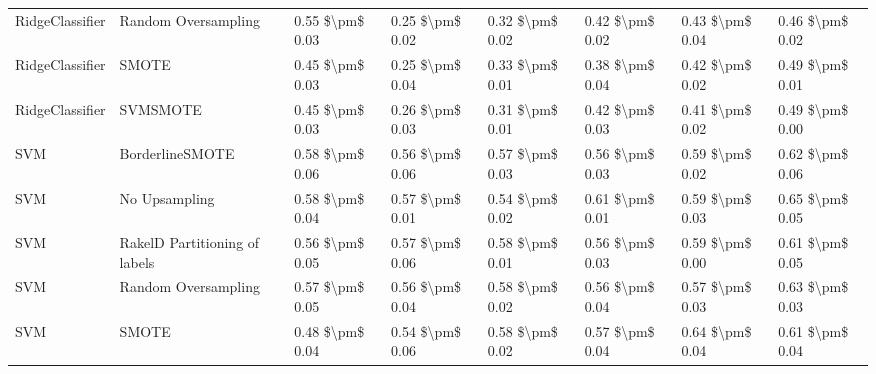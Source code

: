 \begin{tabular}{llllllll}
                RidgeClassifier &           Random Oversampling & 0.55 \$\textbackslash pm\$ 0.03 &           0.25 \$\textbackslash pm\$ 0.02 &       0.32 \$\textbackslash pm\$ 0.02 &        0.42 \$\textbackslash pm\$ 0.02 &                         0.43 \$\textbackslash pm\$ 0.04 & 0.46 \$\textbackslash pm\$ 0.02 \\
                RidgeClassifier &                         SMOTE & 0.45 \$\textbackslash pm\$ 0.03 &           0.25 \$\textbackslash pm\$ 0.04 &       0.33 \$\textbackslash pm\$ 0.01 &        0.38 \$\textbackslash pm\$ 0.04 &                         0.42 \$\textbackslash pm\$ 0.02 & 0.49 \$\textbackslash pm\$ 0.01 \\
                RidgeClassifier &                      SVMSMOTE & 0.45 \$\textbackslash pm\$ 0.03 &           0.26 \$\textbackslash pm\$ 0.03 &       0.31 \$\textbackslash pm\$ 0.01 &        0.42 \$\textbackslash pm\$ 0.03 &                         0.41 \$\textbackslash pm\$ 0.02 & 0.49 \$\textbackslash pm\$ 0.00 \\
                            SVM &               BorderlineSMOTE & 0.58 \$\textbackslash pm\$ 0.06 &           0.56 \$\textbackslash pm\$ 0.06 &       0.57 \$\textbackslash pm\$ 0.03 &        0.56 \$\textbackslash pm\$ 0.03 &                         0.59 \$\textbackslash pm\$ 0.02 & 0.62 \$\textbackslash pm\$ 0.06 \\
                            SVM &                 No Upsampling & 0.58 \$\textbackslash pm\$ 0.04 &           0.57 \$\textbackslash pm\$ 0.01 &       0.54 \$\textbackslash pm\$ 0.02 &        0.61 \$\textbackslash pm\$ 0.01 &                         0.59 \$\textbackslash pm\$ 0.03 & 0.65 \$\textbackslash pm\$ 0.05 \\
                            SVM & RakelD Partitioning of labels & 0.56 \$\textbackslash pm\$ 0.05 &           0.57 \$\textbackslash pm\$ 0.06 &       0.58 \$\textbackslash pm\$ 0.01 &        0.56 \$\textbackslash pm\$ 0.03 &                         0.59 \$\textbackslash pm\$ 0.00 & 0.61 \$\textbackslash pm\$ 0.05 \\
                            SVM &           Random Oversampling & 0.57 \$\textbackslash pm\$ 0.05 &           0.56 \$\textbackslash pm\$ 0.04 &       0.58 \$\textbackslash pm\$ 0.02 &        0.56 \$\textbackslash pm\$ 0.04 &                         0.57 \$\textbackslash pm\$ 0.03 & 0.63 \$\textbackslash pm\$ 0.03 \\
                            SVM &                         SMOTE & 0.48 \$\textbackslash pm\$ 0.04 &           0.54 \$\textbackslash pm\$ 0.06 &       0.58 \$\textbackslash pm\$ 0.02 &        0.57 \$\textbackslash pm\$ 0.04 &                         0.64 \$\textbackslash pm\$ 0.04 & 0.61 \$\textbackslash pm\$ 0.04 \\

\end{tabular}
